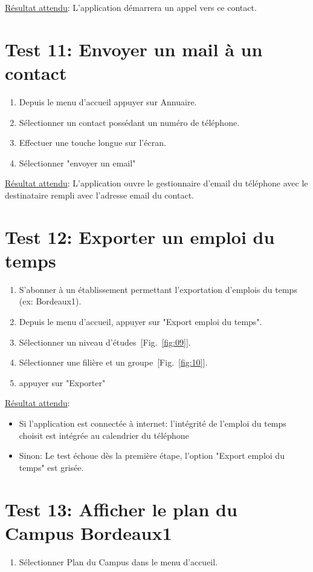 \documentclass [pdftex,12pt] {report}
\begin{document}
    \underline{Résultat attendu}: L'application démarrera un appel vers ce contact.

  \section{Test 11: Envoyer un mail à un contact}
    \begin{enumerate}
    \item Depuis le menu d'accueil appuyer sur Annuaire.
    \item Sélectionner un contact possédant un numéro de téléphone.
    \item Effectuer une touche longue sur l'écran.
    \item Sélectionner "envoyer un email"
    \end{enumerate}

    \underline{Résultat attendu}: L'application ouvre le gestionnaire d'email du téléphone avec le destinataire rempli avec l'adresse email du contact.

  \section{Test 12: Exporter un emploi du temps}
    \begin{enumerate}
    \item S'abonner à un établissement permettant l'exportation d'emplois du temps (ex: Bordeaux1).
    \item Depuis le menu d'accueil, appuyer sur "Export emploi du temps".
    \item Sélectionner un niveau d'études~[Fig.~\ref{fig:09}].
    \item Sélectionner une filière et un groupe~[Fig.~\ref{fig:10}].
    \item appuyer sur "Exporter"
    \end{enumerate}

    \underline{Résultat attendu}:
    \begin{itemize}
    \item Si l'application est connectée à internet: l'intégrité de l'emploi du temps choisit est intégrée au calendrier du téléphone
    \item Sinon: Le test échoue dès la première étape, l'option "Export emploi du temps" est grisée.
    \end{itemize}

  \section{Test 13: Afficher le plan du Campus Bordeaux1}
    \begin{enumerate}
    \item Sélectionner Plan du Campus dans le menu d'accueil.
    \end{enumerate}
\end{document}
